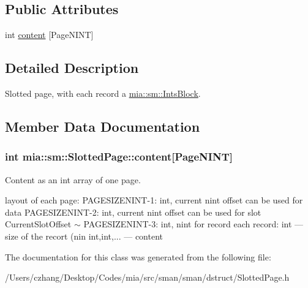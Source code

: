 \subsection*{Public Attributes}
\begin{DoxyCompactItemize}
\item 
int \hyperlink{classmia_1_1sm_1_1_slotted_page_a78f57370f4f7799df331f4f454e072fb}{content} \mbox{[}Page\-N\-I\-N\-T\mbox{]}
\end{DoxyCompactItemize}


\subsection{Detailed Description}
Slotted page, with each record a \hyperlink{classmia_1_1sm_1_1_ints_block}{mia\-::sm\-::\-Ints\-Block}. 

\subsection{Member Data Documentation}
\hypertarget{classmia_1_1sm_1_1_slotted_page_a78f57370f4f7799df331f4f454e072fb}{
\subsubsection[{content}]{\setlength{\rightskip}{0pt plus 5cm}int mia\-::sm\-::\-Slotted\-Page\-::content\mbox{[}Page\-N\-I\-N\-T\mbox{]}}}\label{classmia_1_1sm_1_1_slotted_page_a78f57370f4f7799df331f4f454e072fb}
Content as an int array of one page.

layout of each page\-: P\-A\-G\-E\-S\-I\-Z\-E\-N\-I\-N\-T-\/1\-: int, current nint offset can be used for data P\-A\-G\-E\-S\-I\-Z\-E\-N\-I\-N\-T-\/2\-: int, current nint offset can be used for slot Current\-Slot\-Offset $\sim$ P\-A\-G\-E\-S\-I\-Z\-E\-N\-I\-N\-T-\/3\-: int, nint for record each record\-: int --- size of the recort (nin int,int,... --- content 

The documentation for this class was generated from the following file\-:\begin{DoxyCompactItemize}
\item 
/\-Users/czhang/\-Desktop/\-Codes/mia/src/sman/sman/dstruct/Slotted\-Page.\-h\end{DoxyCompactItemize}
